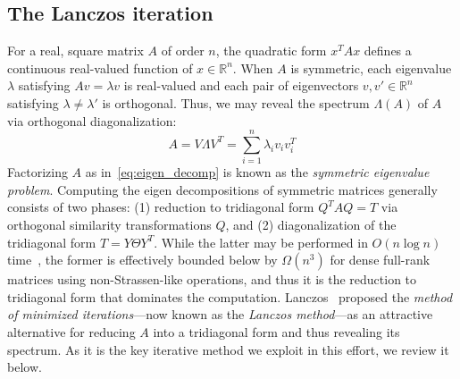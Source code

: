 \documentclass[10pt]{article}
\numberwithin{equation}{section}
\newcommand{\+}{%
	\raisebox{0.18ex}{\scaleobj{0.55}{+}}
}
\DeclareMathOperator*{\argmin}{arg\,min}
\theoremstyle{definition}
\theoremstyle{definition}
\begin{document}
\subsection{The Lanczos iteration}\label{sec:lanczos_it}
For a real, square matrix $A$ of order $n$, the quadratic form $x^T A x$ defines a continuous real-valued function of $x \in \mathbb{R}^n$. When $A$ is symmetric, each eigenvalue $\lambda$ satisfying $A v = \lambda v$ is real-valued and each pair of eigenvectors $v, v' \in \mathbb{R}^n$ satisfying $\lambda \neq \lambda'$ is orthogonal.  
Thus, we may reveal the spectrum $\Lambda(A)$ of $A$ via orthogonal diagonalization:
\begin{equation}\label{eq:eigen_decomp}
	A = V \Lambda V^T = \sum\limits_{i=1}^n \lambda_i v_i v_i^T
\end{equation}
Factorizing $A$ as in~\eqref{eq:eigen_decomp} is known as the \emph{symmetric eigenvalue problem}. 
Computing the eigen decompositions of symmetric matrices generally consists of two phases: (1) reduction to tridiagonal form $Q^T A Q = T$ via orthogonal similarity transformations $Q$, and (2) diagonalization of the tridiagonal form $T = Y \Theta Y^T$. 
While the latter may be performed in $O(n \log n)$ time~\cite{gu1995divide}, the former is effectively bounded below by $\Omega(n^3)$ for dense full-rank matrices using non-Strassen-like operations, and thus it is the reduction to tridiagonal form that dominates the computation. 
Lanczos~\cite{lanczos1950iteration} proposed the \emph{method of minimized iterations}---now known as the \emph{Lanczos method}---as an attractive alternative for reducing $A$ into a tridiagonal form and thus revealing its spectrum. As it is the key iterative method we exploit in this effort, we review it below. 
\end{document}
